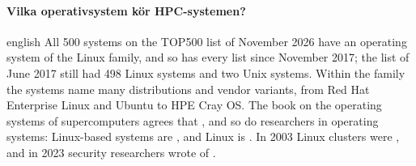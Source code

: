 \paragraph{%
  {Vilka operativsystem kör HPC-systemen?}} %
\begin{onlyin}{english} %
All 500 systems on the TOP500 list of November 2026 have an operating
system of the Linux family, and so has every list since November 2017;
the list of June 2017 still had 498 Linux systems and two Unix
systems\autocite{Top500OSFamily2026}.  Within the family the systems name
many distributions and vendor variants, from Red Hat Enterprise Linux and
Ubuntu to HPE Cray OS\autocite{Top500OS2026}.  The book on the operating
systems of supercomputers agrees that , and so do
researchers in operating systems: Linux-based systems are
, and Linux is
.  In 2003 Linux clusters were
, and in 2023
security researchers wrote of .


\end{onlyin}
